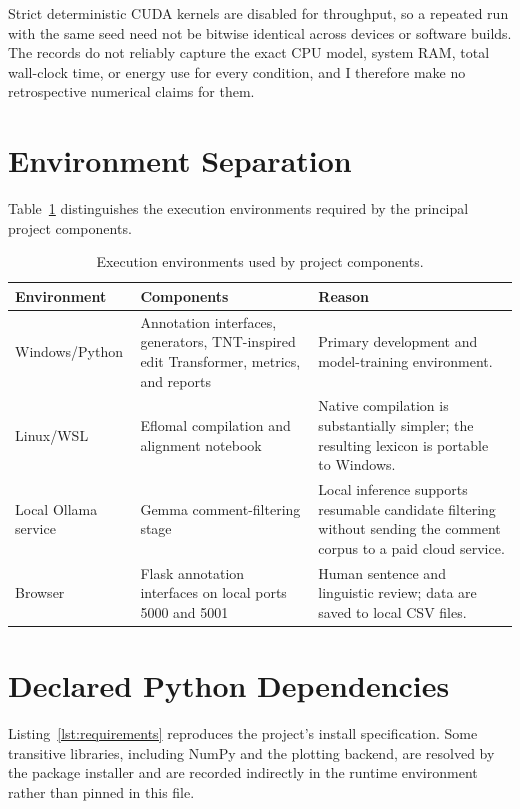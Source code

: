 \documentclass[12pt, a4paper, twoside, openany]{report}
\begin{document}
Strict deterministic CUDA kernels are disabled for throughput, so a repeated run with the same seed need not be bitwise identical across devices or software builds. The records do not reliably capture the exact CPU model, system RAM, total wall-clock time, or energy use for every condition, and I therefore make no retrospective numerical claims for them.

\section{Environment Separation}

Table~\ref{tab:environment-separation} distinguishes the execution environments required by the principal project components.

\begin{table}[H]
  \centering
  \caption{Execution environments used by project components.}
  \label{tab:environment-separation}
  \begin{tabularx}{\textwidth}{p{3.3cm}p{4.5cm}X}
    \toprule
    \textbf{Environment} & \textbf{Components} & \textbf{Reason} \\
    \midrule
    Windows/Python & Annotation interfaces, generators, TNT-inspired edit Transformer, metrics, and reports & Primary development and model-training environment. \\
    Linux/WSL & Eflomal compilation and alignment notebook & Native compilation is substantially simpler; the resulting lexicon is portable to Windows. \\
    Local Ollama service & Gemma comment-filtering stage & Local inference supports resumable candidate filtering without sending the comment corpus to a paid cloud service. \\
    Browser & Flask annotation interfaces on local ports 5000 and 5001 & Human sentence and linguistic review; data are saved to local CSV files. \\
    \bottomrule
  \end{tabularx}
\end{table}

\section{Declared Python Dependencies}

Listing~\ref{lst:requirements} reproduces the project's install specification. Some transitive libraries, including NumPy and the plotting backend, are resolved by the package installer and are recorded indirectly in the runtime environment rather than pinned in this file.
\end{document}
